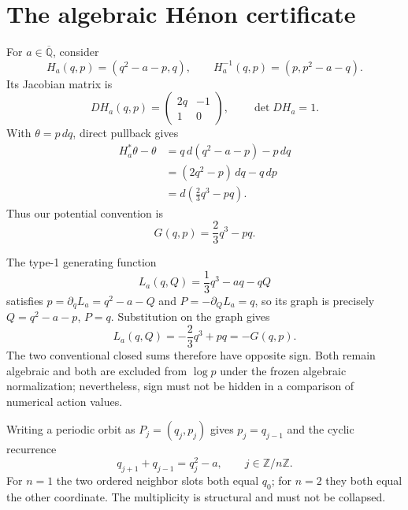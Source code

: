 \documentclass[11pt]{article}
\theoremstyle{definition}
\theoremstyle{remark}
\newcommand{\Qbar}{\overline{\mathbb Q}}
\newcommand{\Z}{\mathbb Z}
\begin{document}
\section{The algebraic H\'enon certificate}
\label{sec:henon}

For $a\in\Qbar$, consider
\begin{equation}
  H_a(q,p)=(q^2-a-p,q),
  \qquad H_a^{-1}(q,p)=(p,p^2-a-q).
  \label{eq:henon-map}
\end{equation}
Its Jacobian matrix is
\begin{equation}
  DH_a(q,p)=\begin{pmatrix}2q&-1\\1&0\end{pmatrix},
  \qquad \det DH_a=1.
\end{equation}
With $\theta=p\,dq$, direct pullback gives
\begin{align}
 H_a^*\theta-
 \theta
 &=q\,d(q^2-a-p)-p\,dq \\
 &=(2q^2-p)\,dq-q\,dp \\
 &=d\left(\frac23q^3-pq\right).
 \label{eq:henon-potential}
\end{align}
Thus our potential convention is
\begin{equation}
  G(q,p)=\frac23q^3-pq.
  \label{eq:G}
\end{equation}

The type-1 generating function
\begin{equation}
  L_a(q,Q)=\frac13q^3-aq-qQ
  \label{eq:L}
\end{equation}
satisfies $p=\partial_qL_a=q^2-a-Q$ and
$P=-\partial_QL_a=q$, so its graph is precisely
$Q=q^2-a-p$, $P=q$.  Substitution on the graph gives
\begin{equation}
  L_a(q,Q)=-\frac23q^3+pq=-G(q,p).
  \label{eq:sign}
\end{equation}
The two conventional closed sums therefore have opposite sign.  Both remain
algebraic and both are excluded from $\log p$ under the frozen algebraic
normalization; nevertheless, sign must not be hidden in a comparison of
numerical action values.

Writing a periodic orbit as
$P_j=(q_j,p_j)$ gives $p_j=q_{j-1}$ and the cyclic recurrence
\begin{equation}
  q_{j+1}+q_{j-1}=q_j^2-a,
  \qquad j\in\Z/n\Z.
  \label{eq:recurrence}
\end{equation}
For $n=1$ the two ordered neighbor slots both equal $q_0$; for $n=2$ they
both equal the other coordinate.  The multiplicity is structural and must
not be collapsed.
\end{document}
